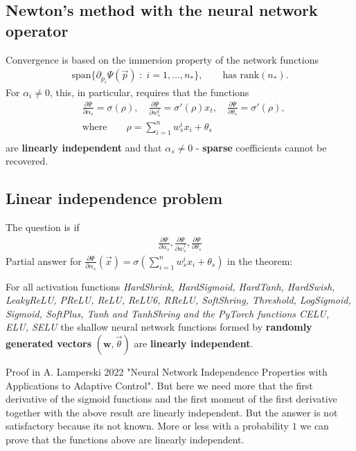 \subsection{Newton's method with the neural network operator}
Convergence is based on the immersion property of the network functions
\begin{align}
    \text{span}\{\partial_{p_i}\Psi(\vec{p})\;:\;i=1,\ldots,n_*\}, \qquad
    \text{has rank}(n_*).
\end{align}
For $\alpha_i \neq 0$, this, in particular, requires that the functions
\begin{align}
    & \frac{\partial \Psi}{\partial \alpha_s} =\sigma(\rho),\quad
     \frac{\partial \Psi}{\partial w_s^{t}} =\sigma'(\rho)x_t,\quad
     \frac{\partial \Psi}{\partial \theta_s} =\sigma'(\rho),\\
    & \text{where} \qquad
    \rho = \sum_{i=1}^{n}w_s^{i}x_i + \theta_s \\
\end{align}
are \textbf{linearly independent} and that $\alpha_s \neq 0$ -
\textbf{sparse} coefficients cannot be recovered.
\subsection{Linear independence problem}
The question is if
\begin{align}
    \frac{\partial \Psi}{\partial \alpha_s} ,
    \frac{\partial \Psi}{\partial w_s^{\dagger}} ,
    \frac{\partial \Psi}{\partial \theta_s}
\end{align}
Partial answer for $\frac{\partial \Psi}{\partial \alpha_s} (\vec{x}) =
\sigma\left( \sum_{i=1}^{n} w_s^{i}x_i + \theta_s \right)$ in the
\cite{lamperski_2022} theorem:
\begin{theorem}
    For all activation functions \textit{HardShrink, HardSigmoid, HardTanh,
    HardSwish, LeakyReLU, PReLU, ReLU, ReLU6, RReLU, SoftShring, Threshold,
    LogSigmoid, Sigmoid, SoftPlus, Tanh and TanhShring and the PyTorch
    functions CELU, ELU, SELU} the shallow neural network functions formed by
    \textbf{randomly generated vectors} $(\mathbf{w}, \vec{\theta})$ are
    \textbf{linearly independent}.
\end{theorem}
Proof in A. Lamperski 2022 "Neural Network Independence Properties with
Applications to Adaptive Control". But here we need more that the first
derivative of the sigmoid functions and the first moment of the first
derivative together with the above result are linearly independent.
But the answer is not satisfactory because its not known. More or less with a
probability $1$ we can prove that the functions above are linearly
independent.

